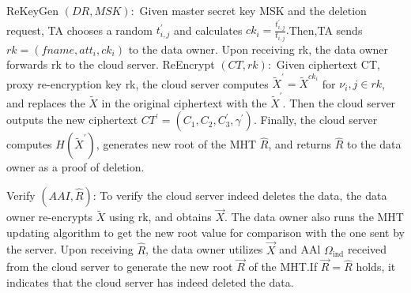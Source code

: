 \documentclass[runningheads]{llncs}
\begin{document}
ReKeyGen $(DR,MSK):$ Given master secret key MSK and the deletion request, TA chooses a random $t_{i,j}^{\prime}$ and calculates $ck_{i}=\frac{t_{i,j}^{\prime}}{t_{i,j}}.$Then,TA sends $rk=(fname,att_{i},ck_{i})$ to the data owner. Upon receiving rk, the data owner forwards rk to the cloud server.
ReEncrypt $(CT,rk):$ Given ciphertext CT, proxy re-encryption key rk, the cloud server computes $\widetilde{X}^{\prime}=\widetilde{X}^{ck_i}$ for $\nu_i,j\in rk$, and replaces the $\widetilde{X}$ in the original ciphertext with the $\widetilde{X}^{\prime}.$ Then the cloud server outputs the new ciphertext $CT^{\prime}=(C_1,C_2,C_3^{\prime},\gamma^{\prime}).$ Finally, the cloud server computes $H(\tilde{X}^{\prime})$, generates new root of the MHT $\hat{R}$, and returns $\hat{R}$ to the data owner as a proof of deletion.

Verify $(AAI,\hat{R})$: To verify the cloud server indeed deletes the data, the data owner re-encrypts $\tilde{X}$ using rk, and obtains $\vec{X}.$ The data owner also runs the MHT updating algorithm to get the new root value for comparison with the one sent by the server. Upon receiving $\hat{R}$, the data owner utilizes $\vec{X}$ and AAl $\Omega_\mathrm{ind}$ received from the cloud server to generate the new root $\overrightarrow{R}$ of the MHT.If $\overrightarrow{R}=\hat{R}$ holds, it indicates that the cloud server has indeed deleted the data.
\end{document}
